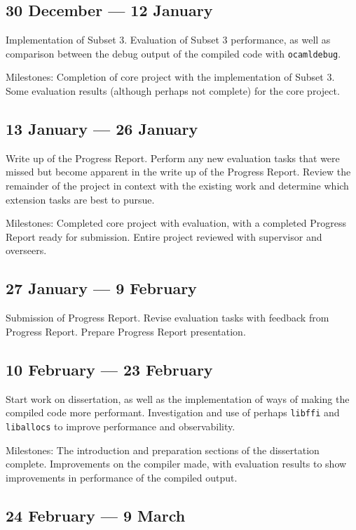 \subsection*{30 December --- 12 January}

Implementation of Subset 3. Evaluation of Subset 3 performance, as well as
comparison between the debug output of the compiled code with
\texttt{ocamldebug}.

Milestones: Completion of core project with the implementation of Subset 3.
Some evaluation results (although perhaps not complete) for the core project.

\subsection*{13 January --- 26 January}

Write up of the Progress Report. Perform any new evaluation tasks that were
missed but become apparent in the write up of the Progress Report. Review the
remainder of the project in context with the existing work and determine which
extension tasks are best to pursue.

Milestones: Completed core project with evaluation, with a completed Progress
Report ready for submission. Entire project reviewed with supervisor and
overseers.

\subsection*{27 January --- 9 February}

Submission of Progress Report. Revise evaluation tasks with feedback from
Progress Report. Prepare Progress Report presentation.

\subsection*{10 February --- 23 February}

Start work on dissertation, as well as the implementation of ways of making the
compiled code more performant. Investigation and use of perhaps \texttt{libffi}
and \texttt{liballocs} to improve performance and observability.

Milestones: The introduction and preparation sections of the dissertation
complete. Improvements on the compiler made, with evaluation results to show
improvements in performance of the compiled output.

\subsection*{24 February --- 9 March}

